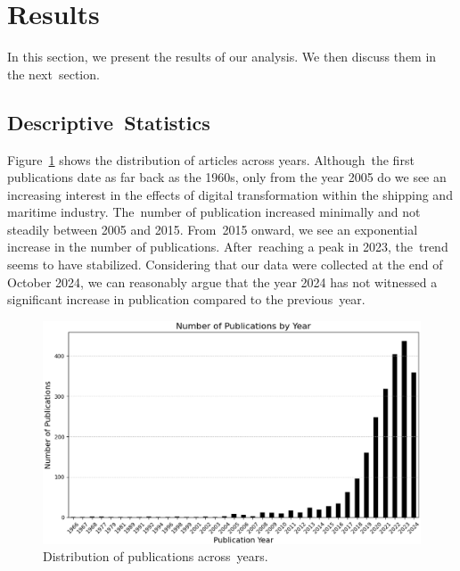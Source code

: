 \documentclass[jmse,review,accept,pdftex,moreauthors]{Definitions/mdpi}
\begin{document}
\section{Results}

In this section, we present the results of our analysis. We then discuss them in the next~section.

\subsection{Descriptive~Statistics}
Figure~\ref{fig:fig1} shows the distribution of articles across years. Although~the first publications date as far back as the 1960s, only from the year 2005 do we see an increasing interest in the effects of digital transformation within the shipping and maritime industry. The~number of publication increased minimally and not steadily between 2005 and 2015. From~2015 onward, we see an exponential increase in the number of publications. After~reaching a peak in 2023, the~trend seems to have stabilized. Considering that our data were collected at the end of October 2024, we can reasonably argue that the year 2024 has not witnessed a significant increase in publication compared to the previous~year.


\begin{figure}[H]

	\includegraphics[width=\linewidth]{pics/no_publications_year.eps}
	\caption{Distribution of publications across~years.}\label{fig:fig1}
\end{figure}
\end{document}
